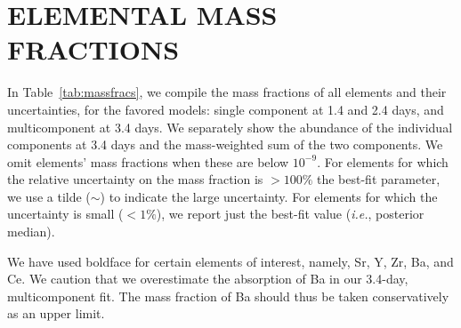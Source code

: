 \documentclass[twocolumn,twocolappendix]{aastex63}
\def\ie{{\it i.e.}}
\begin{document}
{{{{{{{{%
\section{ELEMENTAL MASS FRACTIONS}\label{app:massfracs_detailed}

In Table~\ref{tab:massfracs}, we compile the mass fractions of all elements and their uncertainties, for the favored models: single component at 1.4 and 2.4 days, and multicomponent at 3.4 days. We separately show the abundance of the individual components at 3.4 days and the mass-weighted sum of the two components. We omit elements' mass fractions when these are below $10^{-9}$. For elements for which the relative uncertainty on the mass fraction is $>100\%$ the best-fit parameter, we use a tilde ($\sim$) to indicate the large uncertainty. For elements for which the uncertainty is small ($<1\%$), we report just the best-fit value (\ie, posterior median).

We have used boldface for certain elements of interest, namely, Sr, Y, Zr, Ba, and Ce. We caution that we overestimate the absorption of Ba in our 3.4-day, multicomponent fit. The mass fraction of Ba should thus be taken conservatively as an upper limit.



}}}}}}}}
\end{document}

